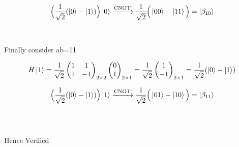 \documentclass[a4paper,12pt]{article}
\begin{document}
\begin{enumerate}[label=(\alph*)]
\[\Big(\frac{1}{\sqrt{2}}(\ket{0}-\ket{1})\Big)\ket{0}\xrightarrow{\text{CNOT}}\frac{1}{\sqrt{2}}\Big(\ket{00}- \ket{11}\Big) = \ket{\beta_{10}}\] \\~\\

Finally consider ab=11

\[H\ket{1} = \frac{1}{\sqrt{2}}\begin{pmatrix}1 & 1  \\
    1 & -1\end{pmatrix}_{2 \times 2} \begin{pmatrix}0 \\
    1\end{pmatrix}_{2 \times 1} = \frac{1}{\sqrt{2}}\begin{pmatrix}1 \\
    -1\end{pmatrix}_{2 \times 1} = \frac{1}{\sqrt{2}}( {\ket{0} - \ket{1}})\]


\[\Big(\frac{1}{\sqrt{2}}(\ket{0}-\ket{1})\Big)\ket{1}\xrightarrow{\text{CNOT}}\frac{1}{\sqrt{2}}\Big(\ket{01}- \ket{10}\Big) = \ket{\beta_{11}}\] \\~\\
\begin{center}
    Hence Verified\\~\\
\end{center}


\end{enumerate}
\end{document}
